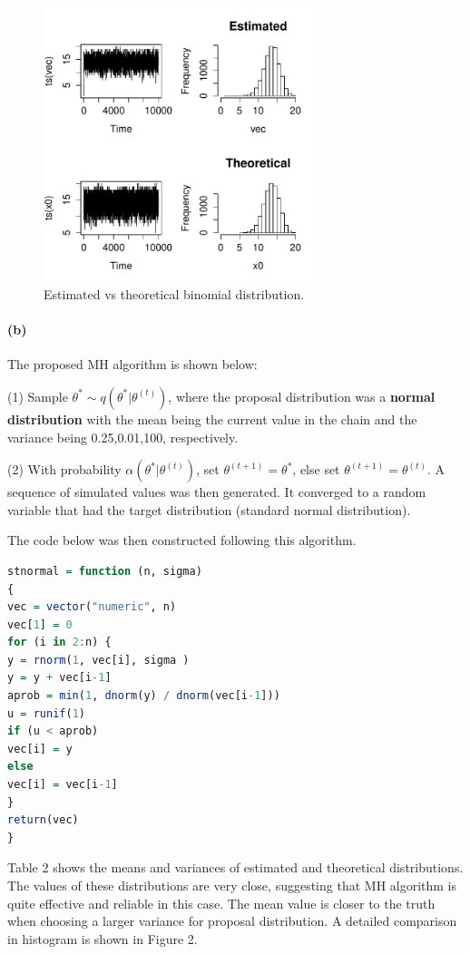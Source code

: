 \documentclass[10pt, letterpaper]{proc}
\begin{document}
\begin{figure}[h]
	\centering \includegraphics[width = 8cm]{1a}
	\caption{Estimated vs theoretical binomial distribution.}
\end{figure}

\paragraph{(b)}The proposed MH algorithm is shown below:

(1) Sample $\theta^\ast \sim q(\theta^\ast | \theta^{(t)})$, where the proposal distribution was a \textbf{normal distribution} with the mean being the current value in the chain and the variance being 0.25,0.01,100, respectively.

(2) With probability $ \alpha(\theta^\ast | \theta^{(t)})$, set $ \theta^{(t+1)} = \theta^\ast$, else set $ \theta^{(t+1)} = \theta^{(t)}$. A sequence of simulated values was then generated. It converged to a random variable that had the target distribution (standard normal distribution). 

The code below was then constructed following this algorithm. 

\begin{lstlisting}[language=R, breaklines=T, basicstyle=\footnotesize\ttfamily]
stnormal = function (n, sigma)
{
vec = vector("numeric", n)
vec[1] = 0
for (i in 2:n) {
y = rnorm(1, vec[i], sigma )
y = y + vec[i-1]
aprob = min(1, dnorm(y) / dnorm(vec[i-1]))
u = runif(1)
if (u < aprob) 
vec[i] = y
else 
vec[i] = vec[i-1]
}
return(vec)
}
\end{lstlisting}

Table 2 shows the means and variances of estimated and theoretical distributions. The values of these distributions are very close, suggesting that MH algorithm is quite effective and reliable in this case. The mean value is closer to the truth when choosing a larger variance for proposal distribution. A detailed comparison in histogram is shown in Figure 2. 
\end{document}
